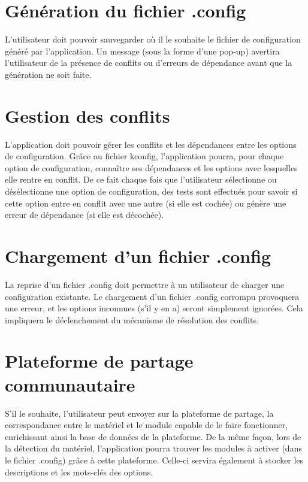 \documentclass[16pts]{report}
\begin{document}
\section{Génération du fichier .config}
\label{sec:Génération du fichier .config}

L'utilisateur doit pouvoir sauvegarder où il le souhaite le fichier de
configuration généré par l'application. Un message (sous la forme d'une pop-up)
avertira l'utilisateur de la présence de conflits ou d'erreurs de dépendance
avant que la génération ne soit faite.

\section{Gestion des conflits}
\label{sec:Gestion des conflits}

L'application doit pouvoir gérer les conflits et les dépendances entre les
options de configuration. Grâce au fichier kconfig, l'application pourra, pour
chaque option de configuration, connaître ses dépendances et les options avec
lesquelles elle rentre en conflit. De ce fait chaque fois que l'utilisateur
sélectionne ou désélectionne une option de configuration, des tests sont
effectués pour savoir si cette option entre en conflit avec une autre (si elle
est cochée) ou génère une erreur de dépendance (si elle est décochée).

\section{Chargement d'un fichier .config}
\label{sec:Chargement d'un fichier .config}

La reprise d'un fichier .config doit permettre à un utilisateur de charger une
configuration existante. Le chargement d'un fichier .config corrompu provoquera
une erreur, et les options inconnues (s'il y en a) seront simplement ignorées.
Cela impliquera le déclenchement du mécanisme de résolution des conflits.

\section{Plateforme de partage communautaire}
\label{sec:Plateforme de partage communautaire}

S'il le souhaite, l'utilisateur peut envoyer sur la plateforme de partage, la
correspondance entre le matériel et le module capable de le faire fonctionner,
enrichissant ainsi la base de données de la plateforme.
De la même façon, lors de la détection du matériel, l'application pourra
trouver les modules à activer (dans le fichier .config) grâce à cette
plateforme. Celle-ci servira également à stocker les descriptions et les
mots-clés des options.
\end{document}
